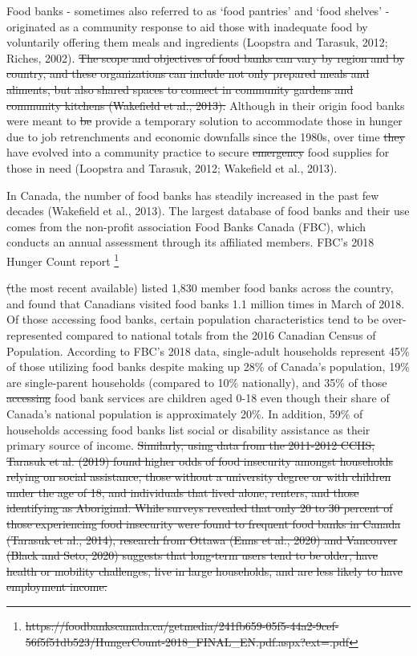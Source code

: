 \documentclass[]{elsarticle} %
\providecommand{\DIFaddtex}[1]{{\protect\color{blue}\uwave{#1}}} %
\providecommand{\DIFdeltex}[1]{{\protect\color{red}\sout{#1}}}                      %
\providecommand{\DIFaddbegin}{} %
\providecommand{\DIFaddend}{} %
\providecommand{\DIFdelbegin}{} %
\providecommand{\DIFdelend}{} %
\providecommand{\DIFadd}[1]{\texorpdfstring{\DIFaddtex{#1}}{#1}} %
\providecommand{\DIFdel}[1]{\texorpdfstring{\DIFdeltex{#1}}{}} %
\newcommand{\DIFscaledelfig}{0.5}
\newlength{\DIFdelgraphicswidth} %
\newlength{\DIFdelgraphicsheight} %
\newcommand{\DIFaddincludegraphics}[2][]{{\color{blue}\fbox{\DIFOincludegraphics[#1]{#2}}}} %
\newcommand{\DIFdelincludegraphics}[2][]{%
\sbox{\DIFdelgraphicsbox}{\DIFOincludegraphics[#1]{#2}}%
\settoboxwidth{\DIFdelgraphicswidth}{\DIFdelgraphicsbox} %
\settoboxtotalheight{\DIFdelgraphicsheight}{\DIFdelgraphicsbox} %
\scalebox{\DIFscaledelfig}{%
\parbox[b]{\DIFdelgraphicswidth}{\usebox{\DIFdelgraphicsbox}\\[-\baselineskip] \rule{\DIFdelgraphicswidth}{0em}}\llap{\resizebox{\DIFdelgraphicswidth}{\DIFdelgraphicsheight}{%
\setlength{\unitlength}{\DIFdelgraphicswidth}%
\begin{picture}(1,1)%
\thicklines\linethickness{2pt} %
{\color[rgb]{1,0,0}\put(0,0){\framebox(1,1){}}}%
{\color[rgb]{1,0,0}\put(0,0){\line( 1,1){1}}}%
{\color[rgb]{1,0,0}\put(0,1){\line(1,-1){1}}}%
\end{picture}%
}\hspace*{3pt}}} %
} %
\DeclareRobustCommand{\DIFaddbegin}{\DIFOaddbegin \let\includegraphics\DIFaddincludegraphics} %
\DeclareRobustCommand{\DIFaddend}{\DIFOaddend \let\includegraphics\DIFOincludegraphics} %
\DeclareRobustCommand{\DIFdelbegin}{\DIFOdelbegin \let\includegraphics\DIFdelincludegraphics} %
\DeclareRobustCommand{\DIFdelend}{\DIFOaddend \let\includegraphics\DIFOincludegraphics} %
\begin{document}
Food banks - sometimes also referred to as `food pantries' and `food
shelves' - originated as a community response to aid those with
inadequate food by voluntarily offering them meals and ingredients
(Loopstra and Tarasuk, 2012; Riches, 2002). \DIFdelbegin \DIFdel{The scope and objectives of
food banks can vary by region and by country, and these organizations
can include not only prepared meals and aliments, but also shared spaces
to connect in community gardens and community kitchens (Wakefield et
al., 2013). }\DIFdelend Although in their origin
food banks were meant to \DIFdelbegin \DIFdel{be }\DIFdelend provide a temporary solution to accommodate
those in hunger due to job retrenchments and economic downfalls since
the 1980s, over time \DIFdelbegin \DIFdel{they
}\DIFdelend \DIFaddbegin \DIFadd{many }\DIFaddend have evolved into a community practice to
secure \DIFdelbegin \DIFdel{emergency }\DIFdelend food supplies for those in need (Loopstra and Tarasuk, 2012;
Wakefield et al., 2013). \DIFdelbegin %

\DIFdelend In Canada, the number of food banks has
steadily increased in the past few decades (Wakefield et al., 2013). The
largest database of food banks and their use comes from the non-profit
association Food Banks Canada (FBC), which conducts an annual assessment
through its affiliated members. FBC's 2018 Hunger Count report \DIFdelbegin \footnote{\DIFdel{https://foodbankscanada.ca/getmedia/241fb659-05f5-44a2-9cef-56f5f51db523/HungerCount-2018\_FINAL\_EN.pdf.aspx?ext=.pdf}}
\addtocounter{footnote}{-1}%
\DIFdel{(}\DIFdelend \DIFaddbegin \DIFadd{(FBC,
2018) (}\DIFaddend the most recent available) listed 1,830 member food banks across
the country, and found that Canadians visited food banks 1.1 million
times in March of 2018. Of those accessing food banks, certain
population characteristics tend to be over-represented compared to
national totals from the 2016 Canadian Census of Population. According
to FBC's 2018 data, single-adult households represent 45\% of those
utilizing food banks despite making up 28\% of Canada's population, 19\%
are single-parent households (compared to 10\% nationally), and 35\% of
those \DIFdelbegin \DIFdel{accessing }\DIFdelend \DIFaddbegin \DIFadd{using }\DIFaddend food bank services are children aged 0-18 even though their
share of Canada's national population is approximately 20\%. In
addition, 59\% of households accessing food banks list social or
disability assistance as their primary source of income.
\DIFdelbegin \DIFdel{Similarly,
using data from the 2011-2012 CCHS, Tarasuk et al. (2019) found higher
odds of food insecurity amongst households relying on social assistance,
those without a university degree or with children under the age of 18,
and individuals that lived alone, renters, and those identifying as
Aboriginal. While surveys revealed that only 20 to 30 percent of those
experiencing food insecurity were found to frequent food banks in Canada
(Tarasuk et al., 2014), research from Ottawa (Enns et al., 2020) and
Vancouver (Black and Seto, 2020) suggests that long-term users tend to
be older, have health or mobility challenges, live in large households,
and are less likely to have employment income.
}\DIFdelend 
\end{document}
